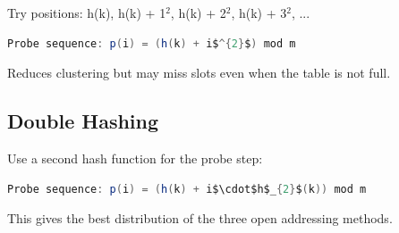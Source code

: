 Try positions: h(k), h(k) + 1$^{2}$, h(k) + 2$^{2}$, h(k) + 3$^{2}$, ...

\begin{lstlisting}[language=Java]
Probe sequence: p(i) = (h(k) + i$^{2}$) mod m
\end{lstlisting}

Reduces clustering but may miss slots even when the table is not full.

\subsection{Double Hashing}

Use a second hash function for the probe step:

\begin{lstlisting}[language=Java]
Probe sequence: p(i) = (h(k) + i$\cdot$h$_{2}$(k)) mod m
\end{lstlisting}

This gives the best distribution of the three open addressing methods.


